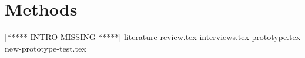 
\chapter{Methods}
[***** INTRO MISSING *****]
{literature-review.tex}
{interviews.tex}
{prototype.tex}
{new-prototype-test.tex}
